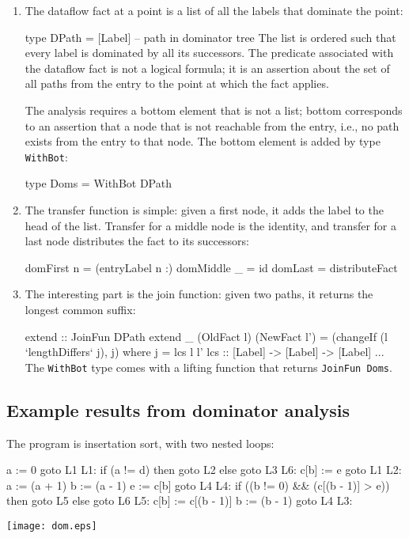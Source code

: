 \documentclass[twocolumn]{article}
\newenvironment{code}{\par\unskip\kern-6pt \small\verbatim}{\endverbatim}
\newenvironment{smallcode}{\par\unskip\footnotesize\verbatim}{\endverbatim}
\begin{document}
\begin{enumerate}
\item
The dataflow fact at a point is a list of all the labels that dominate
the point:
\begin{code}
type DPath = [Label] -- path in dominator tree
\end{code}
The list is ordered such that every label is dominated by all its
successors.
The predicate associated with the dataflow fact is not a logical
formula; it is an assertion about the set of all paths from the entry to
the point at which the fact applies.

The analysis requires a bottom element that is not a list;
bottom corresponds to an assertion that a node that is not reachable
from the entry, i.e., no path exists from the entry to that node.
The bottom element is added by type \texttt{WithBot}:
\begin{code}
type Doms = WithBot DPath
\end{code}
\item
The transfer function is simple: given a first node, it adds the label
to the head of the list.
Transfer for a middle node is the identity, and
transfer for a last node distributes the fact to its successors:
\begin{code}
domFirst n  = (entryLabel n :)
domMiddle _ = id
domLast     = distributeFact
\end{code}
\item
The interesting part is the join function:
given two paths, it returns the longest common suffix:
\begin{code}
extend :: JoinFun DPath
extend _ (OldFact l) (NewFact l')
  = (changeIf (l `lengthDiffers` j), j)
 where j = lcs l l'
       lcs :: [Label] -> [Label] -> [Label]
       ...
\end{code}
The \texttt{WithBot} type comes with a lifting function that returns
\texttt{JoinFun~Doms}.
\end{enumerate}

\subsection{Example results from dominator analysis}

The program is insertation sort, with two nested loops:
\begin{smallcode}
  a := 0
  goto L1
L1:
  if (a != d) then goto L2 else goto L3
L6:
  c[b] := e
  goto L1
L2:
  a := (a + 1)
  b := (a - 1)
  e := c[b]
  goto L4
L4:
  if ((b != 0) && (c[(b - 1)] > e)) then goto L5 else goto L6
L5:
  c[b] := c[(b - 1)]
  b := (b - 1)
  goto L4
L3:
\end{smallcode}

\centerline{%
\texttt{[image: dom.eps]}%
}
\end{document}

